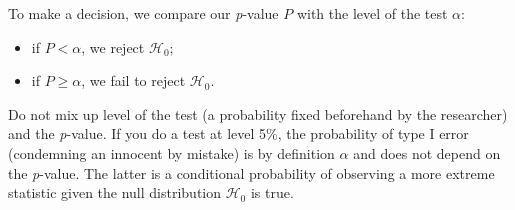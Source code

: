 \documentclass[
  11pt,
  letterpaper,
]{scrbook}
\providecommand{\tightlist}{%
  \setlength{\itemsep}{0pt}\setlength{\parskip}{0pt}}\usepackage{longtable,booktabs,array}
\theoremstyle{definition}
\theoremstyle{remark}
\begin{document}
To make a decision, we compare our \emph{p}-value \(P\) with the level
of the test \(\alpha\):

\begin{itemize}
\tightlist
\item
  if \(P < \alpha\), we reject \(\mathscr{H}_0\);
\item
  if \(P \geq \alpha\), we fail to reject \(\mathscr{H}_0\).
\end{itemize}

Do not mix up level of the test (a probability fixed beforehand by the
researcher) and the \emph{p}-value. If you do a test at level 5\%, the
probability of type I error (condemning an innocent by mistake) is by
definition \(\alpha\) and does not depend on the \emph{p}-value. The
latter is a conditional probability of observing a more extreme
statistic given the null distribution \(\mathscr{H}_0\) is true.
\end{document}

